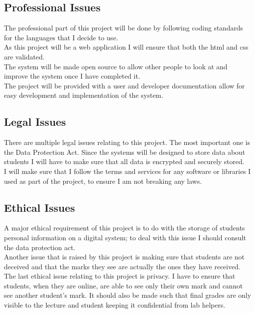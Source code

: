 \documentclass[12pt]{article}  %
\begin{document}
\subsection{Professional Issues}
The professional part of this project will be done by following coding standards for the languages that I decide to use.\\
As this project will be a web application I will ensure that both the html and css are validated.\\
The system will be made open source to allow other people to look at and improve the system once I have completed it.\\
The project will be provided with a  user and developer documentation allow for easy development and implementation of the system.


\subsection{Legal Issues}
There are multiple legal issues relating to this project. The most important one is the Data Protection Act. Since the systems will be designed to store data about students I will have to make sure that all data is encrypted and securely stored.\\
I will make sure that I follow the terms and services for any software or libraries I used as part of the project, to ensure I am not breaking any laws.


\subsection{Ethical Issues}
A major ethical requirement of this project is to do with the storage of students personal information on a digital system; to deal with this issue I should consult the data protection act. \\
Another issue that is raised by this project is making sure that students are not deceived and that the marks they see are actually the ones they have received.\\
The last ethical issue relating to this project is privacy. I have to  ensure that students, when they are online, are able to see only their own mark and cannot see another student's mark. It should also be made such that final grades are only visible to the lecture and student keeping it confidential from lab helpers.

\end{document}
